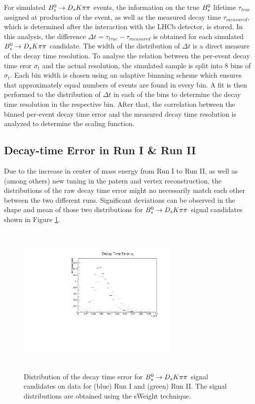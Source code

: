 For simulated ${{B}^0_{s}}\rightarrow{\ensuremath{{D}_{s}}}{\ensuremath{K}}{\ensuremath{\pi}}{\ensuremath{\pi}}$ events, the information on the true ${{B}^0_{s}}$ lifetime $\tau_{true}$ assigned at production of the event, 
as well as the measured decay time $\tau_{measured}$, which is determined after the interaction with the LHCb detector, is stored. 
In this analysis, the difference $\Delta t = \tau_{true} - \tau_{measured}$ is obtained for each simulated ${{B}^0_{s}}\rightarrow{\ensuremath{{D}_{s}}}{\ensuremath{K}}{\ensuremath{\pi}}{\ensuremath{\pi}}$ candidate. 
The width of the distribution of $\Delta t$ is a direct measure of the decay time resolution. \newline 
To analyse the relation between the per-event decay time eror $\sigma_{t}$ and the actual resolution, the simulated sample is split into 8 bins of $\sigma_{t}$. 
Each bin width is chosen using an adaptive binnning scheme which ensures that approximately equal numbers of events are found in every bin.  
A fit is then performed to the distribution of $\Delta t$ in each of the bins to determine the decay time resolution in the respective bin. 
After that, the correlation between the binned per-event decay time error and the measured decay time resolution is analyzed to determine the scaling function.     


\subsection{Decay-time Error in Run I \& Run II}

Due to the increase in center of mass energy from Run I to Run II, as well as (among others) new tuning in the patern and vertex reconstruction, 
the distributions of the raw decay time error might no necessarily match each other between the two different runs. 
Significant deviations can be observed in the shape and mean of those two distributions for ${{B}^0_{s}}\rightarrow{\ensuremath{{D}_{s}}}{\ensuremath{K}}{\ensuremath{\pi}}{\ensuremath{\pi}}$ signal candidates shown in Figure \ref{fig:Bs_DTFERR_Comp}.

\begin{figure}[h]
\includegraphics[height=7.4cm,width=0.7\textwidth]{figs/Resolution/Bs_DTFERR_runComp.pdf}
\caption{Distribution of the decay time error for ${{B}^0_{s}}\rightarrow{\ensuremath{{D}_{s}}}{\ensuremath{K}}{\ensuremath{\pi}}{\ensuremath{\pi}}$ signal candidates on data for (blue) Run I and (green) Run II. The signal distributions are obtained using the sWeight technique.}
\label{fig:Bs_DTFERR_Comp}
\end{figure}

